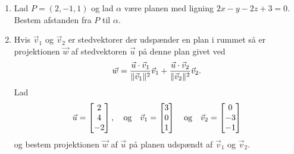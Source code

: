 \begin{enumerate}
	\item Lad $P=(2,-1,1)$ og lad $\alpha$ være planen med ligning $2x-y-2z+3=0$. Bestem afstanden fra $P$ til $\alpha$.


	\item Hvis $\vec{v}_1$ og $\vec{v}_2$ er stedvektorer der udspænder en plan i rummet så er projektionen $\vec{w}$ af stedvektoren $\vec{u}$ på denne plan givet ved
	\begin{align*}
	\vec{w}=\frac{\vec{u}\cdot \vec{v}_1}{\Vert \vec{v}_1\Vert^2}\vec{v}_1+\frac{\vec{u}\cdot \vec{v}_2}{\Vert \vec{v}_2\Vert^2}\vec{v}_2.
	\end{align*}
	Lad
	\begin{align*}
	\vec{u}=\begin{bmatrix}
	2\\4\\-2
	\end{bmatrix},\quad \textup{og}\quad \vec{v}_1=\begin{bmatrix}
	3\\0\\1
	\end{bmatrix}
	\quad \textup{og}\quad \vec{v}_2=\begin{bmatrix}
	0\\-3\\-1
	\end{bmatrix}
	\end{align*}
	og bestem projektionen $\vec{w}$ af $\vec{u}$ på planen udspændt af $\vec{v}_1$ og $\vec{v}_2$.
	
	
\end{enumerate}